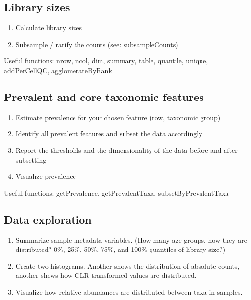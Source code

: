 \documentclass[
]{book}
\providecommand{\tightlist}{%
  \setlength{\itemsep}{0pt}\setlength{\parskip}{0pt}}
\begin{document}
\hypertarget{library-sizes}{%
\subsection{Library sizes}\label{library-sizes}}

\begin{enumerate}
\def\labelenumi{\arabic{enumi}.}
\tightlist
\item
  Calculate library sizes
\item
  Subsample / rarify the counts (see: subsampleCounts)
\end{enumerate}

Useful functions: nrow, ncol, dim, summary, table, quantile, unique, addPerCellQC, agglomerateByRank

\hypertarget{prevalent-and-core-taxonomic-features}{%
\subsection{Prevalent and core taxonomic features}\label{prevalent-and-core-taxonomic-features}}

\begin{enumerate}
\def\labelenumi{\arabic{enumi}.}
\tightlist
\item
  Estimate prevalence for your chosen feature (row, taxonomic group)
\item
  Identify all prevalent features and subset the data accordingly
\item
  Report the thresholds and the dimensionality of the data before and after subsetting
\item
  Visualize prevalence
\end{enumerate}

Useful functions: getPrevalence, getPrevalentTaxa, subsetByPrevalentTaxa

\hypertarget{data-exploration}{%
\subsection{Data exploration}\label{data-exploration}}

\begin{enumerate}
\def\labelenumi{\arabic{enumi}.}
\tightlist
\item
  Summarize sample metadata variables. (How many age groups, how they are distributed? 0\%, 25\%, 50\%, 75\%, and 100\% quantiles of library size?)
\item
  Create two histograms. Another shows the distribution of absolute counts, another shows how CLR transformed values are distributed.
\item
  Visualize how relative abundances are distributed between taxa in samples.
\end{enumerate}
\end{document}
